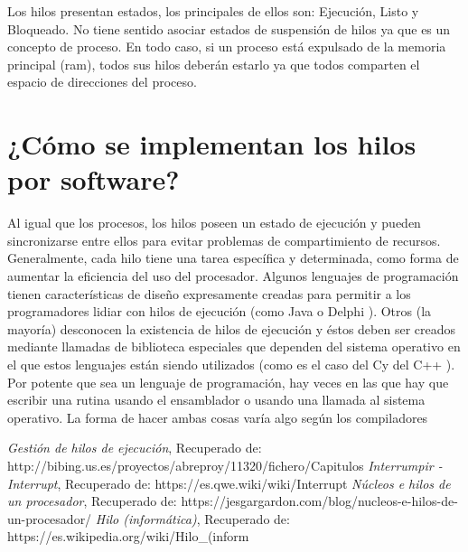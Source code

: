 \documentclass{article}
\begin{document}
Los hilos presentan estados, los principales de ellos son: Ejecución, Listo y Bloqueado. No tiene sentido asociar estados de suspensión de hilos ya que es un concepto de proceso. En todo caso, si un proceso está expulsado de la memoria principal (ram), todos sus hilos deberán estarlo ya que todos comparten el espacio de direcciones del proceso.
\section{¿Cómo se implementan los hilos por software?}
Al igual que los procesos, los hilos poseen un estado de ejecución y pueden sincronizarse entre ellos para evitar problemas de compartimiento de recursos. Generalmente, cada hilo tiene una tarea específica y determinada, como forma de aumentar la eficiencia del uso del procesador.
Algunos lenguajes de programación tienen características de diseño expresamente creadas para permitir a los programadores lidiar con hilos de ejecución (como Java o Delphi ). Otros (la mayoría) desconocen la existencia de hilos de ejecución y éstos deben ser creados mediante llamadas de biblioteca especiales que dependen del sistema operativo en el que estos lenguajes están siendo utilizados (como es el caso del Cy del C++ ).
\newline
Por potente que sea un lenguaje de programación, hay veces en las que hay que escribir una rutina usando el ensamblador o usando una llamada al sistema operativo. La forma de hacer ambas cosas varía algo según los compiladores




\newpage

\begin{thebibliography}{X}

\textit{Gestión de hilos de ejecución}, Recuperado de: http://bibing.us.es/proyectos/abreproy/11320/fichero/Capitulos%
\textit{Interrumpir - Interrupt}, Recuperado de: https://es.qwe.wiki/wiki/Interrupt
\textit{Núcleos e hilos de un procesador}, Recuperado de: https://jesgargardon.com/blog/nucleos-e-hilos-de-un-procesador/
\textit{Hilo (informática)}, 
Recuperado de: https://es.wikipedia.org/wiki/Hilo_(inform%



\end{thebibliography}
\end{document}
